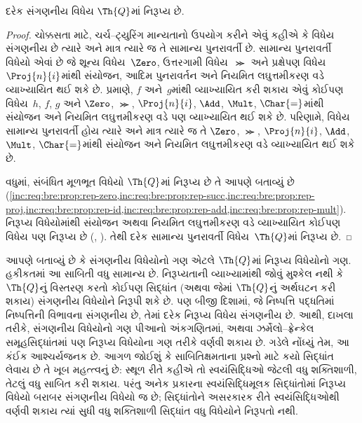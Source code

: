 \begin{thm}
દરેક સંગણનીય વિધેય
$\Th{Q}$માં નિરૂપ્ય છે.
\end{thm}

\begin{proof}
ચોક્કસતા માટે, ચર્ચ--ટ્યુરિંગ
માન્યતાનો ઉપયોગ કરીને એવું
કહીએ કે વિધેય સંગણનીય છે
ત્યારે અને માત્ર ત્યારે જ
તે સામાન્ય પુનરાવર્તી છે.
સામાન્ય પુનરાવર્તી વિધેયો
એવાં છે જે શૂન્ય વિધેય~$\Zero$,
ઉત્તરગામી વિધેય~$\Succ$ અને
પ્રક્ષેપણ વિધેય~$\Proj{n}{i}$માંથી
સંયોજન, આદિમ પુનરાવર્તન અને
નિયમિત લઘુત્તમીકરણ વડે
વ્યાખ્યાયિત થઈ શકે છે.
 પ્રમાણે,
$f$ અને~$g$માંથી વ્યાખ્યાયિત
કરી શકાય એવું કોઈપણ વિધેય~$h$,
$f$, $g$ અને $\Zero$,
$\Succ$, $\Proj{n}{i}$,
$\Add$, $\Mult$, $\Char{=}$માંથી
સંયોજન અને નિયમિત લઘુત્તમીકરણ
વડે પણ વ્યાખ્યાયિત થઈ શકે છે.
પરિણામે, વિધેય સામાન્ય પુનરાવર્તી
હોય ત્યારે અને માત્ર ત્યારે જ
તે $\Zero$, $\Succ$,
$\Proj{n}{i}$, $\Add$,
$\Mult$, $\Char{=}$માંથી
સંયોજન અને નિયમિત લઘુત્તમીકરણ
વડે વ્યાખ્યાયિત થઈ શકે છે.

વધુમાં, સંબંધિત મૂળભૂત વિધેયો
$\Th{Q}$માં નિરૂપ્ય છે તે આપણે
બતાવ્યું છે
(\cref{inc:req:bre:prop:rep-zero,inc:req:bre:prop:rep-succ,inc:req:bre:prop:rep-proj,inc:req:bre:prop:rep-id,inc:req:bre:prop:rep-add,inc:req:bre:prop:rep-mult}).
નિરૂપ્ય વિધેયોમાંથી સંયોજન
અથવા નિયમિત લઘુત્તમીકરણ
વડે વ્યાખ્યાયિત કોઈપણ વિધેય
પણ નિરૂપ્ય છે
(,
).
તેથી દરેક સામાન્ય પુનરાવર્તી
વિધેય~$\Th{Q}$માં નિરૂપ્ય છે.
\end{proof}

\begin{explain}
આપણે બતાવ્યું છે કે સંગણનીય
વિધેયોનો ગણ એટલે $\Th{Q}$માં
નિરૂપ્ય વિધેયોનો ગણ.
હકીકતમાં આ સાબિતી વધુ સામાન્ય
છે. નિરૂપ્યતાની વ્યાખ્યામાંથી
જોવું મુશ્કેલ નથી કે
$\Th{Q}$નું વિસ્તરણ કરતો
કોઈપણ સિદ્ધાંત (અથવા જેમાં
$\Th{Q}$નું અર્થઘટન કરી શકાય)
સંગણનીય વિધેયોને નિરૂપી શકે છે.
પણ બીજી દિશામાં, જે
નિષ્પત્તિ પદ્ધતિમાં
નિષ્પત્તિની વિભાવના સંગણનીય
છે, તેમાં દરેક નિરૂપ્ય વિધેય
સંગણનીય છે. આથી, દાખલા તરીકે,
સંગણનીય વિધેયોનો ગણ પીઆનો
અંકગણિતમાં, અથવા ઝર્મેલો--ફ્રેન્કેલ
સમૂહસિદ્ધાંતમાં પણ નિરૂપ્ય
વિધેયોના ગણ તરીકે વર્ણવી શકાય
છે. ગડેલે નોંધ્યું તેમ, આ કંઈક
આશ્ચર્યજનક છે. આગળ જોઈશું
કે સાબિતિક્ષમતાના પ્રશ્નો માટે
કયો સિદ્ધાંત લેવાય છે તે ખૂબ
મહત્ત્વનું છે: સ્થૂળ રીતે કહીએ
તો સ્વયંસિદ્ધિઓ જેટલી વધુ
શક્તિશાળી, તેટલું વધુ સાબિત
કરી શકાય. પરંતુ અનેક પ્રકારના
સ્વયંસિદ્ધિમૂલક સિદ્ધાંતોમાં
નિરૂપ્ય વિધેયો બરાબર સંગણનીય
વિધેયો જ છે; સિદ્ધાંતોને
અસરકારક રીતે સ્વયંસિદ્ધિઓથી વર્ણવી શકાય
ત્યાં સુધી વધુ શક્તિશાળી
સિદ્ધાંત વધુ વિધેયોને નિરૂપતો
નથી.
\end{explain}
\endgroup


